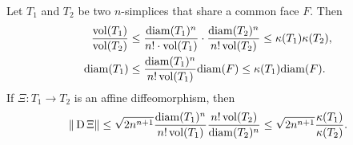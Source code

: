 \documentclass[a4paper]{article}
\begin{document}
\begin{lemma}\label{lemma:volumecomparison}
    Let $T_1$ and $T_2$ be two $n$-simplices that share a common face $F$. Then 
    \begin{align*}
        \frac{ \operatorname{vol}(T_1) }{ \operatorname{vol}(T_2) }
        &\leq 
        \frac{{\operatorname{diam}}(T_1)^{n}}{n! \cdot \operatorname{vol}(T_1)} 
        \cdot 
        \frac{{\operatorname{diam}}(T_2)^{n}}{n! \operatorname{vol}(T_2)} 
        \leq 
        \kappa(T_1) \kappa(T_2)
        ,
        \\
        {\operatorname{diam}}(T_1)
        &\leq 
        \frac{ {\operatorname{diam}}(T_1)^{n} }{ n! \operatorname{vol}(T_1) }
        {\operatorname{diam}}(F)
        \leq 
        \kappa(T_1)
        {\operatorname{diam}}(F)
        .
    \end{align*}
    If $\Xi : T_1 \rightarrow T_2$ is an affine diffeomorphism, then 
    \begin{align*}
        \| \operatorname{D} \Xi \|
        \leq 
        \sqrt{2n^{n+1}} 
        \frac{ {\operatorname{diam}}(T_1)^{n} }{ n! \operatorname{vol}(T_1) }
        \frac{ n! \operatorname{vol}(T_2) } { {\operatorname{diam}}(T_2)^{n} } 
        \leq 
        \sqrt{2n^{n+1}} 
        \frac{ \kappa(T_1) }{ \kappa(T_2) }
        .
    \end{align*}
\end{lemma}
\end{document}
